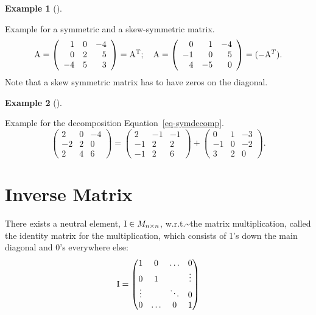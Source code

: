 \documentclass[
  a4paper,
  DIV=11,
  numbers=noendperiod,
  oneside]{scrreprt}
\theoremstyle{definition}
\newtheorem{example}{Example}[chapter]
\theoremstyle{remark}
\begin{document}
\begin{example}[]\protect\hypertarget{exm-}{}\label{exm-}

Example for a symmetric and a skew-symmetric matrix.
\[ {\rm A}= \left( \begin{array}{rrr}
 1  & 0  & {-4}  \\
 0  & 2  & 5  \\
 -4  & 5  & 3  
\end{array}  \right) = {\rm A^T}; \quad  {\rm A} = \left(\begin{array}{rrr}
 0  & 1  & {-4}  \\
 -1  & 0  & 5  \\
 4  & -5  & 0  
\end{array}  \right) = (- {\rm A}^T).\] Note that a skew symmetric
matrix has to have zeros on the diagonal.

\end{example}

\begin{example}[]\protect\hypertarget{exm-}{}\label{exm-}

Example for the decomposition Equation~\ref{eq-symdecomp}.
\[\left( \begin{array}{rrr}
 2  & 0  & {-4}  \\
 {-2}  & 2  & 0  \\
 2  & 4  & 6  
\end{array}  \right) =\left(\begin{array}{rrr}
 2  & {-1}  & {-1}  \\
 {-1}  & 2  & 2  \\
 {-1}  & 2  & 6  
\end{array}  \right)+\left( \begin{array}{rrr}
 0  & 1  & {-3}  \\
 {-1}  & 0  & {-2}  \\
 3  & 2  & 0  
\end{array}  \right).\]

\end{example}

\section{Inverse Matrix}\label{inverse-matrix}

There exists a neutral element, \({\rm I} \in M_{n\times n}\),
w.r.t.\textasciitilde the matrix multiplication, called the identity
matrix for the multiplication, which consists of 1's down the main
diagonal and 0's everywhere else: \[{\rm I} =  \begin{pmatrix}
          1 &0  &\ldots   &0  \\
          0 &1  &   &\vdots   \\
           \vdots  &   & \ddots  &0 \\
          0   &  \ldots &  0&1
        \end{pmatrix}\]
\end{document}
